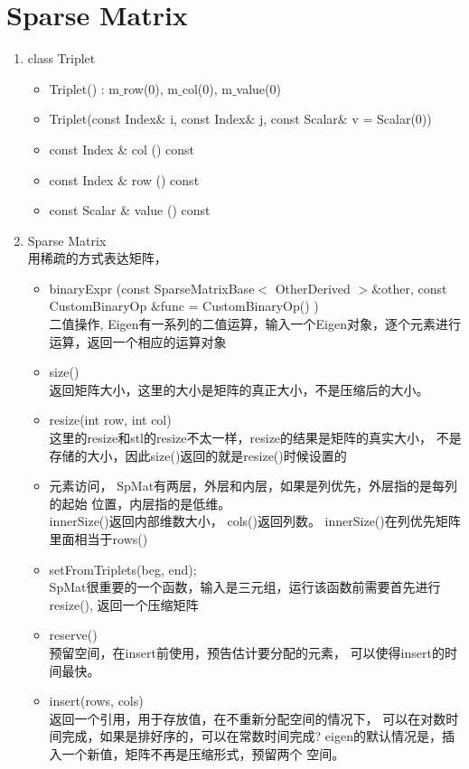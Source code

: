 \chapter{Sparse Matrix}
\begin{enumerate}
\item class Triplet
\begin{itemize}
\item Triplet() : m$\_$row(0), m$\_$col(0), m$\_$value(0)
\item Triplet(const Index$\&$ i, const Index$\&$ j, const Scalar$\&$ v = Scalar(0))
\item const Index $\&$ col () const
\item const Index $\&$ 	row () const
\item const Scalar $\&$ value () const
\end{itemize}
\item Sparse Matrix
\\用稀疏的方式表达矩阵，
\begin{itemize}
\item binaryExpr (const SparseMatrixBase$<$ OtherDerived $> \&$other,
const CustomBinaryOp $\&$func = CustomBinaryOp() )	
\\二值操作, Eigen有一系列的二值运算，输入一个Eigen对象，逐个元素进行
运算，返回一个相应的运算对象
\item size()
\\返回矩阵大小，这里的大小是矩阵的真正大小，不是压缩后的大小。
\item resize(int row, int col)
\\这里的resize和stl的resize不太一样，resize的结果是矩阵的真实大小，
不是存储的大小，因此size()返回的就是resize()时候设置的
\item 元素访问，
SpMat有两层，外层和内层，如果是列优先，外层指的是每列的起始
位置，内层指的是低维。
\\innerSize()返回内部维数大小， cols()返回列数。
innerSize()在列优先矩阵里面相当于rows()
\item setFromTriplets(beg, end);
\\SpMat很重要的一个函数，输入是三元组，运行该函数前需要首先进行
resize(), 返回一个压缩矩阵
\item reserve()
\\预留空间，在insert前使用，预告估计要分配的元素，
可以使得insert的时间最快。
\item insert(rows, cols)
\\返回一个引用，用于存放值，在不重新分配空间的情况下，
可以在对数时间完成，如果是排好序的，可以在常数时间完成?
eigen的默认情况是，插入一个新值，矩阵不再是压缩形式，预留两个
空间。
\end{itemize}
\end{enumerate}
